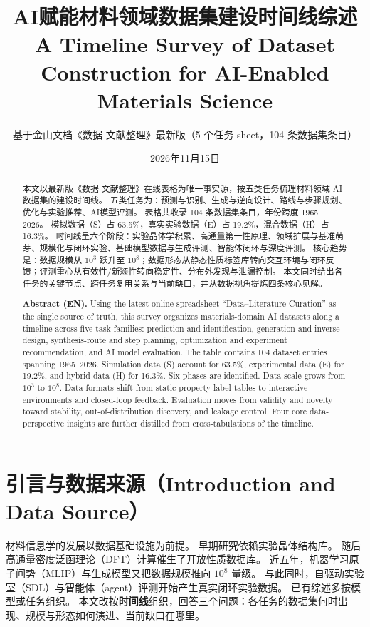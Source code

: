 \documentclass[11pt,a4paper]{ctexart}
\title{\textbf{AI赋能材料领域数据集建设时间线综述}\\[0.3em]
\large A Timeline Survey of Dataset Construction for AI-Enabled Materials Science}
\author{基于金山文档《数据-文献整理》最新版（5 个任务 sheet，104 条数据集条目）}
\date{2026年11月15日}
\begin{document}
\maketitle

\begin{abstract}
本文以最新版《数据-文献整理》在线表格为唯一事实源，按五类任务梳理材料领域 AI 数据集的建设时间线。
五类任务为：预测与识别、生成与逆向设计、路线与步骤规划、优化与实验推荐、AI模型评测。
表格共收录 104 条数据集条目，年份跨度 1965--2026。
模拟数据（S）占 63.5\%，真实实验数据（E）占 19.2\%，混合数据（H）占 16.3\%。
时间线呈六个阶段：实验晶体学积累、高通量第一性原理、领域扩展与基准萌芽、规模化与闭环实验、基础模型数据与生成评测、智能体闭环与深度评测。
核心趋势是：数据规模从 $10^3$ 跃升至 $10^8$；数据形态从静态性质标签库转向交互环境与闭环反馈；评测重心从有效性/新颖性转向稳定性、分布外发现与泄漏控制。
本文同时给出各任务的关键节点、跨任务复用关系与当前缺口，并从数据视角提炼四条核心见解。

\smallskip
\textbf{Abstract (EN).} Using the latest online spreadsheet ``Data--Literature Curation'' as the single source of truth, this survey organizes materials-domain AI datasets along a timeline across five task families: prediction and identification, generation and inverse design, synthesis-route and step planning, optimization and experiment recommendation, and AI model evaluation. The table contains 104 dataset entries spanning 1965--2026. Simulation data (S) account for 63.5\%, experimental data (E) for 19.2\%, and hybrid data (H) for 16.3\%. Six phases are identified. Data scale grows from $10^3$ to $10^8$. Data formats shift from static property-label tables to interactive environments and closed-loop feedback. Evaluation moves from validity and novelty toward stability, out-of-distribution discovery, and leakage control. Four core data-perspective insights are further distilled from cross-tabulations of the timeline.
\end{abstract}

\section{引言与数据来源（Introduction and Data Source）}

材料信息学的发展以数据基础设施为前提。
早期研究依赖实验晶体结构库。
随后高通量密度泛函理论（DFT）计算催生了开放性质数据库。
近五年，机器学习原子间势（MLIP）与生成模型又把数据规模推向 $10^8$ 量级。
与此同时，自驱动实验室（SDL）与智能体（agent）评测开始产生真实闭环实验数据。
已有综述多按模型或任务组织。
本文改按\textbf{时间线}组织，回答三个问题：各任务的数据集何时出现、规模与形态如何演进、当前缺口在哪里。
\end{document}
